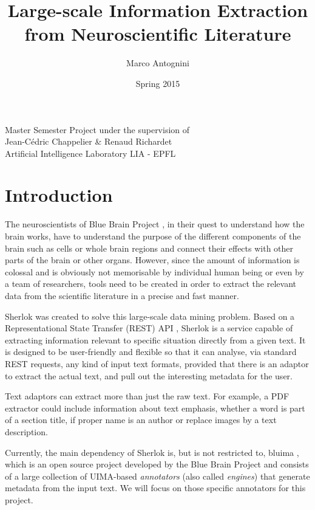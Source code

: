 \documentclass{article}
\title{Large-scale Information Extraction from Neuroscientific Literature}
\date{Spring 2015}
\author{Marco Antognini}
\begin{document}
\maketitle

\begin{center}
    Master Semester Project under the supervision of\\
    Jean-Cédric Chappelier \& Renaud Richardet\\
    Artificial Intelligence Laboratory LIA - EPFL
\end{center}

\newpage
{}


\tableofcontents

\section{Introduction}

The neuroscientists of Blue Brain Project \cite{bbp}, in their quest to understand how the
brain works, have to understand the purpose of the different components of the brain such as cells
or whole brain regions and connect their effects with other parts of the brain or other organs.
However, since the amount of information is colossal and is obviously not memorisable by individual
human being or even by a team of researchers, tools need to be created in order to extract the relevant
data from the scientific literature in a precise and fast manner.

Sherlok \cite{sherlok} was created to solve this large-scale data mining problem. Based on a
Representational State Transfer (REST) API , Sherlok is a service capable of extracting information
relevant to specific situation directly from a given text. It is designed to be user-friendly and
flexible so that it can analyse, via standard REST requests, any kind of input text formats,
provided that there is an adaptor to extract the actual text, and pull out the interesting metadata
for the user.

Text adaptors can extract more than just the raw text. For example, a PDF extractor could include
information about text emphasis, whether a word is part of a section title, if proper name is an
author or replace images by a text description.

Currently, the main dependency of Sherlok is, but is not restricted to, bluima \cite{bluima}, which
is an open source project developed by the Blue Brain Project and consists of a large collection of
UIMA-based \emph{annotators} (also called \emph{engines}) \cite{uima} that generate metadata from
the input text. We will focus on those specific annotators for this project.
\end{document}
